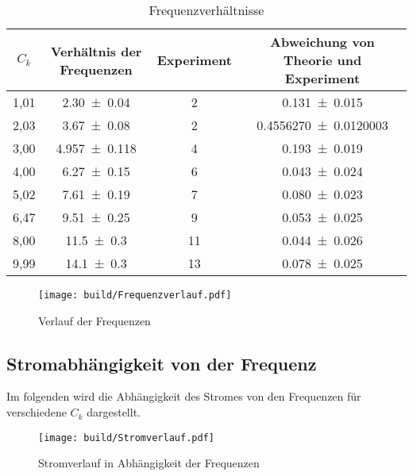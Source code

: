 \begin{table}[H]
    \centering
    \begin{tabular}{c c c c}
        \toprule
        $C_k$    &   Verhältnis der Frequenzen & Experiment & Abweichung von Theorie und Experiment\\
        \midrule
        1,01 & \num{2,30\pm 0,04}     & \num{2}        & \num{0,131\pm 0,015}\\        
        2,03 & \num{3,67\pm 0,08}     & \num{2}        & \num{0,4556270\pm 0,0120003}\\
        3,00 & \num{4,957\pm 0,118}   & \num{4}        & \num{0,193\pm 0,019}\\
        4,00 & \num{6,27\pm 0,15}     & \num{6}        & \num{0,043\pm 0,024}\\
        5,02 & \num{7,61\pm 0,19}     & \num{7}        & \num{0,080\pm 0,023}\\
        6,47 & \num{9,51\pm 0,25}     & \num{9}        & \num{0,053\pm 0,025}\\
        8,00 & \num{11,5\pm 0,3}      & \num{11}       & \num{0,044\pm 0,026}\\       
        9,99 & \num{14,1\pm 0,3}      & \num{13}       & \num{0,078\pm 0,025}\\
       \bottomrule
    \end{tabular}
    \caption{Frequenzverhältnisse}
    \label{tab:Frequenzverhältnisse}
\end{table}

\begin{figure}[H]
    \centering
    \texttt{[image: build/Frequenzverlauf.pdf]}
    \caption{Verlauf der Frequenzen}
    \label{fig:frequenzverlauf}
\end{figure}

\subsection{Stromabhängigkeit von der Frequenz}
Im folgenden wird die Abhängigkeit des Stromes von den Frequenzen für verschiedene $C_k$ dargestellt.
\begin{figure}
    \centering
    \texttt{[image: build/Stromverlauf.pdf]}
    \caption{Stromverlauf in Abhängigkeit der Frequenzen}
    \label{fig:Stromverlauf}
\end{figure}



\label{sec:Auswertung}